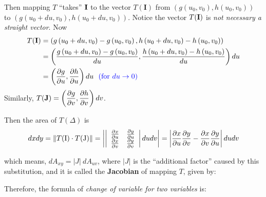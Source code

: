 \documentclass[11pt, a4paper]{MATH2023}
\begin{document}
\begin{spacing}{1.3}
    Then mapping $T$ ``takes'' $\bf I$ to the vector $T(\mathbf{I})$ from 
    $\left(g\left(u_{0}, v_{0}\right), h\left(u_{0}, v_{0}\right)\right)$ to 
    $\left(g\left(u_{0}+d u, v_{0}\right), h\left(u_{0}+d u, v_{0}\right)\right)$. 
    Notice the vector $T({\bf I})$ is {\it not necessary a straight vector}. Now
    $$
    \begin{aligned}
    T(\mathbf{I}) &=\left(g\left(u_{0}+d u, v_{0}\right)-g\left(u_{0}, v_{0}\right), h\left(u_{0}+d u, v_{0}\right)-h\left(u_{0}, v_{0}\right)\right) \\
    &=\left(\frac{g\left(u_{0}+d u, v_{0}\right)-g\left(u_{0}, v_{0}\right)}{d u}, \frac{h\left(u_{0}+d u, v_{0}\right)-h\left(u_{0}, v_{0}\right)}{d u}\right) d u \\
    &=\left(\frac{\partial g}{\partial u}, \frac{\partial h}{\partial u}\right) d u 
    \ \ {\rm \color{blue} (for\ } {\color{blue}  du\rightarrow 0)}
    \end{aligned}
    $$
    Similarly, $\displaystyle T(\mathbf{J})=\left(\frac{\partial g}{\partial v}, \frac{\partial h}{\partial v}\right) dv$. 
    
    Then the area of $T(\Delta)$ is
    $$
    d x d y =\left\| T({\rm I})\cdot T({\rm J}) \right\|=\left| \left|\begin{array}{ll}
    \frac{\partial x}{\partial u} & \frac{\partial y}{\partial u} \\
    \frac{\partial x}{\partial v} & \frac{\partial y}{\partial v}
    \end{array}\right| d u d v\right|=\left| \frac{\partial x}{\partial u} \frac{\partial y}{\partial v}-\frac{\partial x}{\partial v} \frac{\partial y}{\partial u} \right| d u d v
    $$

    which means, $dA_{xy}=|J|\ dA_{uv}$, where $|J|$ is the ``additional factor'' caused by this substitution,
    and it is called the {\bf Jacobian} of mapping $T$, given by: 
    \begin{center}
    \end{center}

    Therefore, the formula of {\it change of variable for two variables} is: 
    \begin{center}
    \end{center}
    


\end{spacing}
\end{document}
